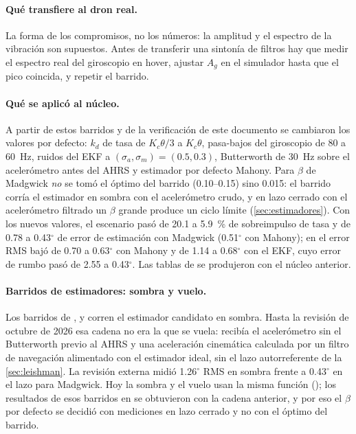 \paragraph{Qué transfiere al dron real.} La forma de los compromisos, no los
números: la amplitud y el espectro de la vibración son supuestos. Antes de
transferir una sintonía de filtros hay que medir el espectro real del
giroscopio en hover, ajustar $A_g$ en el simulador hasta que el pico
coincida, y repetir el barrido.

\paragraph{Qué se aplicó al núcleo.} A partir de estos barridos y de la
verificación de este documento se cambiaron los valores por defecto: $k_d$ de
tasa de $K_c\theta/3$ a $K_c\theta$, pasa-bajos del giroscopio de 80 a 60~Hz,
ruidos del EKF a $(\sigma_a,\sigma_m)=(0.5,0.3)$, Butterworth de 30~Hz sobre el
acelerómetro antes del AHRS y estimador por defecto Mahony. Para $\beta$ de
Madgwick \emph{no} se tomó el óptimo del barrido (0.10--0.15) sino 0.015: el
barrido corría el estimador en sombra con el acelerómetro crudo, y en lazo
cerrado con el acelerómetro filtrado un $\beta$ grande produce un ciclo
límite (\cref{sec:estimadores}). Con los nuevos valores, el escenario
 pasó de 20.1 a 5.9~\% de sobreimpulso de tasa y de
0.78 a 0.43$^\circ$ de error de estimación con Madgwick (0.51$^\circ$ con
Mahony); en  el error RMS bajó de 0.70 a 0.63$^\circ$
con Mahony y de 1.14 a 0.68$^\circ$ con el EKF, cuyo error de rumbo pasó de
2.55 a 0.43$^\circ$. Las tablas de  se produjeron con
el núcleo anterior.

\paragraph{Barridos de estimadores: sombra y vuelo.} Los barridos de
,  y  corren el
estimador candidato en sombra. Hasta la revisión de octubre de 2026 esa
cadena no era la que se vuela: recibía el acelerómetro sin el Butterworth
previo al AHRS y una aceleración cinemática calculada por un filtro de
navegación alimentado con el estimador ideal, sin el lazo autorreferente de
la \cref{sec:leishman}. La revisión externa midió 1.26$^\circ$ RMS en sombra
frente a 0.43$^\circ$ en el lazo para Madgwick. Hoy la sombra y el vuelo usan
la misma función (); los resultados de esos
barridos en  se obtuvieron con la cadena anterior, y
por eso el $\beta$ por defecto se decidió con mediciones en lazo cerrado y
no con el óptimo del barrido.
